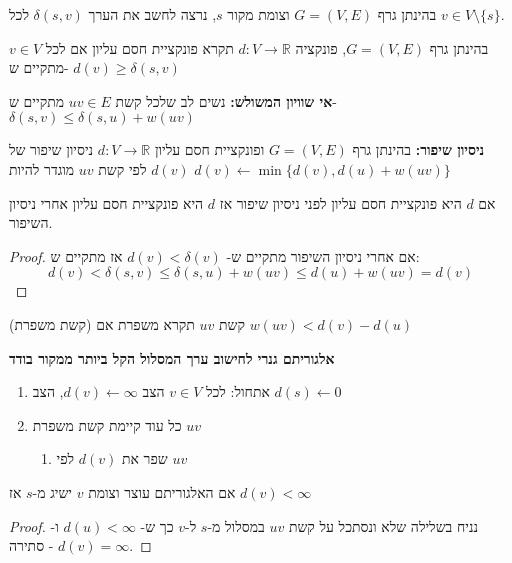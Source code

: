 בהינתן גרף 
$G = (V, E)$
וצומת מקור $s$,
נרצה לחשב את הערך 
$\delta(s,v)$
לכל 
$v \in V \setminus \{s\}$.

\begin{definition}
בהינתן גרף 
$G = (V, E)$,
פונקציה 
$d:V \to \mathbb{R}$
תקרא פונקציית חסם עליון אם לכל 
$v \in V$
מתקיים ש-%
$d(v) \geq \delta(s,v)$
\end{definition}

\textbf{אי שוויון המשולש:}
נשים לב שלכל קשת 
$uv \in E$
מתקיים ש-%
$\delta(s,v) \leq \delta(s,u) + w(uv)$

\textbf{ניסיון שיפור:}
בהינתן גרף 
$G = (V,E)$
ופונקציית חסם עליון 
$d:V \to \mathbb{R}$
ניסיון שיפור של
$d(v)$
לפי קשת $uv$ מוגדר להיות
$d(v) \leftarrow \min\{d(v), d(u) + w(uv)\}$

\begin{claim}
אם $d$ היא פונקציית חסם עליון לפני ניסיון שיפור אז $d$ היא פונקציית חסם עליון אחרי ניסיון השיפור.
\end{claim}
\begin{proof}
אם אחרי ניסיון השיפור מתקיים ש-%
$d(v) < \delta(v)$
אז מתקיים ש:%
$$d(v) < \delta(s,v) \leq \delta(s,u) + w(uv) \leq d(u) + w(uv) = d(v)$$

\end{proof}

\begin{definition}(קשת משפרת)
קשת
$uv$
תקרא משפרת אם
$w(uv) < d(v) - d(u)$
\end{definition}


\textbf{
אלגוריתם גנרי לחישוב ערך המסלול הקל ביותר ממקור בודד
}

\begin{enumerate}
\item
אתחול:
לכל 
$v \in V$
הצב
$d(v) \leftarrow \infty$,
הצב
$d(s) \leftarrow 0$
\item
כל עוד קיימת קשת משפרת 
$uv$
\begin{enumerate}
\item
שפר את 
$d(v)$
לפי
$uv$
\end{enumerate}
\end{enumerate}

\begin{claim}
אם האלגוריתם עוצר וצומת $v$ ישיג מ-$s$ אז 
$d(v) < \infty$
\end{claim}
\begin{proof}
נניח בשלילה שלא ונסתכל על קשת
$uv$
במסלול מ-$s$ ל-$v$ כך ש-%
$d(u) < \infty$
ו-%
$d(v) = \infty$
- סתירה.
\end{proof}



